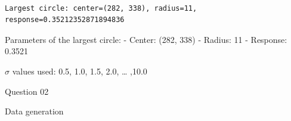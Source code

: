 \documentclass[11pt]{article}
\begin{document}
    \begin{center}
    \end{center}
    { \hspace*{\fill} \\}
    
    \begin{Verbatim}[commandchars=\\\{\}]
Largest circle: center=(282, 338), radius=11, response=0.35212352871894836
    \end{Verbatim}

    Parameters of the largest circle: - Center: (282, 338) - Radius: 11 -
Response: 0.3521

\(\sigma\) values used: 0.5, 1.0, 1.5, 2.0, \ldots{} ,10.0

    Question 02

Data generation
\end{document}
